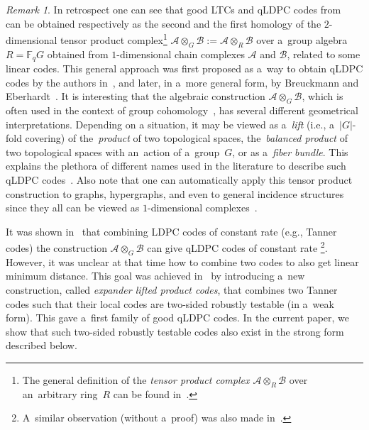 \documentclass[11pt]{article}
\theoremstyle{plain}
\theoremstyle{definition}
\theoremstyle{remark}
\newtheorem{remark}{Remark}
\newcommand{\cA}{\mathcal{A}}
\newcommand{\cB}{\mathcal{B}}
\newcommand{\F}{\mathbb{F}}
\begin{document}
\begin{remark}
In retrospect one can see that good LTCs and qLDPC codes from~\cite{Dinur:stoc2022,Panteleev&Kalachev:stoc2022} can be obtained respectively as the second and the first homology of the $2$-dimensional tensor product complex\footnote{The general definition of the \emph{tensor product complex $\cA \otimes_R \cB$} over an~arbitrary ring~$R$ can be found in~\cite[p.~7]{Brown:1982}.} $\cA \otimes_G \cB := \cA \otimes_R \cB$ over a~group algebra 
$R=\F_qG$ obtained from $1$-dimensional chain complexes $\cA$ and $\cB$, related to some linear codes. This general approach was first proposed as a~way to obtain qLDPC codes by the authors in~\cite{Panteleev&Kalachev:2021}, and later, in a~more general form, by Breuckmann and Eberhardt~\cite{Breuckmann:balanced:2021, Breuckmann:2021}. It is interesting that the algebraic construction $\cA\otimes_G \cB$, which is often used in the context of group cohomology~\cite[p.~55]{Brown:1982}, has several different geometrical interpretations. Depending on a situation, it may be viewed as a~\emph{lift} (i.e., a~$|G|$-fold covering) of the~\emph{product} of two topological spaces, the~\emph{balanced product} of two topological spaces with an~action of a~group~$G$, or as a~\emph{fiber bundle}.   
This explains the plethora of different names used in the literature to describe such qLDPC codes~\cite{Panteleev&Kalachev:2021,Panteleev&Kalachev:stoc2022, Breuckmann:balanced:2021, Breuckmann:2021, Hastings:2021:fiber}. Also note that one can automatically apply this tensor product construction to graphs, hypergraphs, and even to general incidence structures since they all can be viewed as $1$-dimensional complexes~\cite{Breuckmann:balanced:2021,Panteleev&Kalachev:stoc2022}. 
\end{remark}

It was shown in~\cite{Panteleev&Kalachev:2021} that combining LDPC codes of constant rate
(e.g., Tanner codes) the construction $\cA \otimes_G \cB$ can give qLDPC codes of constant rate%
\footnote{A~similar observation (without a~proof) was also made in~\cite{Breuckmann:balanced:2021}.}. 
However, it was unclear at that time how to combine two codes to also get linear minimum distance. This goal was achieved in~\cite{Panteleev&Kalachev:stoc2022} by introducing a~new construction, called \emph{expander lifted product codes}, that combines two Tanner codes such that their local codes are two-sided robustly testable (in a~weak form). This gave a~first family of good qLDPC codes. In the current paper, we show that such two-sided robustly testable codes also exist in the strong form described below. 
\end{document}
